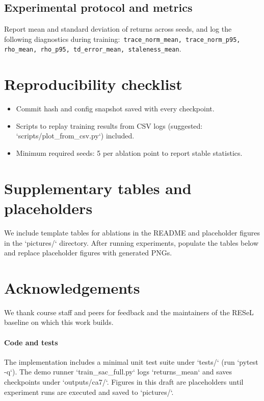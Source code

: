 \documentclass{article}
\begin{document}
\subsection{Experimental protocol and metrics}
Report mean and standard deviation of returns across seeds, and log the following diagnostics during training:\
\texttt{trace_norm_mean, trace_norm_p95, rho_mean, rho_p95, td_error_mean, staleness_mean}.

\section{Reproducibility checklist}
\begin{itemize}
  \item Commit hash and config snapshot saved with every checkpoint.
  \item Scripts to replay training results from CSV logs (suggested: `scripts/plot_from_csv.py`) included.
  \item Minimum required seeds: 5 per ablation point to report stable statistics.
\end{itemize}

\section{Supplementary tables and placeholders}
We include template tables for ablations in the README and placeholder figures in the `pictures/` directory. After running experiments, populate the tables below and replace placeholder figures with generated PNGs.

\section{Acknowledgements}
We thank course staff and peers for feedback and the maintainers of the RESeL baseline on which this work builds.

\paragraph{Code and tests} The implementation includes a minimal unit test suite under
`tests/` (run `pytest -q`). The demo runner `train_sac_full.py` logs `returns_mean`
and saves checkpoints under `outputs/ca7/`. Figures in this draft are placeholders until
experiment runs are executed and saved to `pictures/`.



\end{document}
